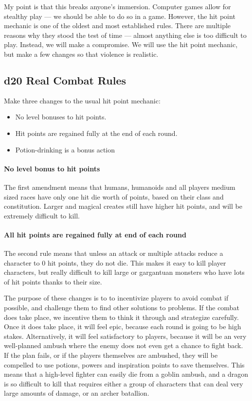\documentclass[twocolumn]{dndbook}
\begin{document}
My point is that this breaks anyone's immersion.
Computer games allow for stealthy play --- we should be able to do so in a game.
However, the hit point mechanic is one of the oldest and most established rules.
There are multiple reasons why they stood the test of time --- almost anything else is too difficult to play.
Instead, we will make a compromise.
We will use the hit point mechanic, but make a few changes so that violence is realistic.

\subsection{d20 Real Combat Rules}

Make three changes to the usual hit point mechanic:
\begin{itemize}
    \item No level bonuses to hit points.
    \item Hit points are regained fully at the end of each round.
    \item Potion-drinking is a bonus action
\end{itemize}

\paragraph*{No level bonus to hit points}
The first amendment means that humans, humanoids and all players medium sized races have only one hit die worth of points, based on their class and constitution.
Larger and magical creates still have higher hit points, and will be extremely difficult to kill.

\paragraph*{All hit points are regained fully at end of each round}
The second rule means that unless an attack or multiple attacks reduce a character to 0 hit points, they do not die.
This makes it easy to kill player characters, but really difficult to kill large or gargantuan monsters who have lots of hit points thanks to their size.\par

The purpose of these changes is to to incentivize players to avoid combat if possible, and challenge them to find other solutions to problems.
If the combat does take place, we incentive them to think it through and strategize carefully.
Once it does take place, it will feel epic, because each round is going to be high stakes.
Alternatively, it will feel satisfactory to players, because it will be an very well-planned ambush where the enemy does not even get a chance to fight back.
If the plan fails, or if the players themselves are ambushed, they will be compelled to use potions, powers and inspiration points to save themselves.
This means that a high-level fighter can easily die from a goblin ambush, and a dragon is so difficult to kill that requires either a group of characters that can deal very large amounts of damage, or an archer batallion.\par
\end{document}

